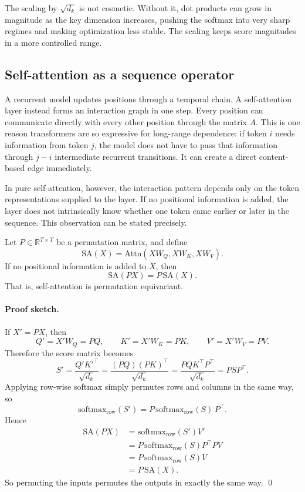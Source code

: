 \medskip

The scaling by \(\sqrt{d_k}\) is not cosmetic.
Without it, dot products can grow in magnitude as the key dimension increases, pushing the softmax into very sharp regimes and making optimization less stable.
The scaling keeps score magnitudes in a more controlled range.

\subsection*{Self-attention as a sequence operator}

A recurrent model updates positions through a temporal chain.
A self-attention layer instead forms an interaction graph in one step.
Every position can communicate directly with every other position through the matrix \(A\).
This is one reason transformers are so expressive for long-range dependence:
if token \(i\) needs information from token \(j\), the model does not have to pass that information through \(j-i\) intermediate recurrent transitions.
It can create a direct content-based edge immediately.

\medskip

In pure self-attention, however, the interaction pattern depends only on the token representations supplied to the layer.
If no positional information is added, the layer does not intrinsically know whether one token came earlier or later in the sequence.
This observation can be stated precisely.

\begin{proposition}
Let \(P \in \mathbb{R}^{T \times T}\) be a permutation matrix, and define
\[
\mathrm{SA}(X)
=
\mathrm{Attn}(XW_Q, XW_K, XW_V).
\]
If no positional information is added to \(X\), then
\[
\mathrm{SA}(PX) = P\,\mathrm{SA}(X).
\]
That is, self-attention is permutation equivariant.
\end{proposition}

\paragraph{Proof sketch.}
If \(X' = PX\), then
\[
Q' = X'W_Q = PQ,
\qquad
K' = X'W_K = PK,
\qquad
V' = X'W_V = PV.
\]
Therefore the score matrix becomes
\[
S' = \frac{Q'{K'}^{\top}}{\sqrt{d_k}}
= \frac{(PQ)(PK)^{\top}}{\sqrt{d_k}}
= \frac{P Q K^{\top} P^{\top}}{\sqrt{d_k}}
= P S P^{\top}.
\]
Applying row-wise softmax simply permutes rows and columns in the same way, so
\[
\mathrm{softmax}_{\mathrm{row}}(S') = P\,\mathrm{softmax}_{\mathrm{row}}(S)\,P^{\top}.
\]
Hence
\[
\begin{aligned}
\mathrm{SA}(PX)
&=
\mathrm{softmax}_{\mathrm{row}}(S')V' \\
&=
P\,\mathrm{softmax}_{\mathrm{row}}(S)P^{\top}PV \\
&=
P\,\mathrm{softmax}_{\mathrm{row}}(S)V \\
&=
P\,\mathrm{SA}(X).
\end{aligned}
\]
So permuting the inputs permutes the outputs in exactly the same way.
\qed

